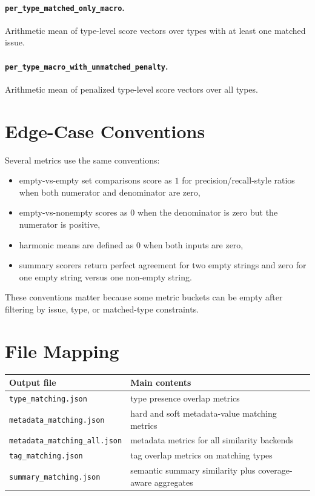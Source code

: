 \documentclass[11pt]{article}
\begin{document}
\paragraph{\texttt{per\_type\_matched\_only\_macro}.}
Arithmetic mean of type-level score vectors over types with at least one matched issue.

\paragraph{\texttt{per\_type\_macro\_with\_unmatched\_penalty}.}
Arithmetic mean of penalized type-level score vectors over all types.

\section{Edge-Case Conventions}
Several metrics use the same conventions:
\begin{itemize}[leftmargin=*]
\item empty-vs-empty set comparisons score as $1$ for precision/recall-style ratios when both numerator and denominator are zero,
\item empty-vs-nonempty scores as $0$ when the denominator is zero but the numerator is positive,
\item harmonic means are defined as $0$ when both inputs are zero,
\item summary scorers return perfect agreement for two empty strings and zero for one empty string versus one non-empty string.
\end{itemize}

These conventions matter because some metric buckets can be empty after filtering by issue, type, or matched-type constraints.

\section{File Mapping}
\begin{center}
\begin{tabular}{ll}
\toprule
Output file & Main contents \\
\midrule
\texttt{type\_matching.json} & type presence overlap metrics \\
\texttt{metadata\_matching.json} & hard and soft metadata-value matching metrics \\
\texttt{metadata\_matching\_all.json} & metadata metrics for all similarity backends \\
\texttt{tag\_matching.json} & tag overlap metrics on matching types \\
\texttt{summary\_matching.json} & semantic summary similarity plus coverage-aware aggregates \\
\bottomrule
\end{tabular}
\end{center}
\end{document}
